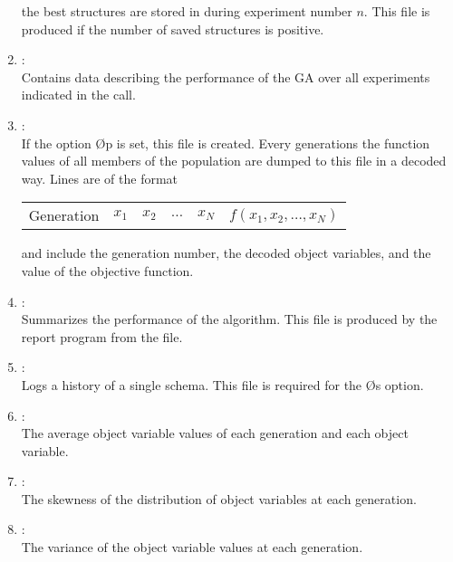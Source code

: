 \begin{enumerate}
	the best structures are stored in  during experiment 
	number $n$.  
	This file  is produced if the number of saved structures is positive.
%
\item	{}: 						\\
	Contains data describing the performance of  the  GA over all
	experiments indicated in the call.
%
\item	{}: 						\\
	If the option \O{p} is set, this file is created. 
	Every  generations the function values of 
	all members of the population are dumped to this file in a decoded way. 
	Lines are of the format
	\begin{center}
	\begin{tabular}{rrrcrr}
		Generation	& $x_1$ & $x_2$ & $\ldots$ 
				& $x_N$ & $f(x_1,x_2,\ldots,x_N)$ \\
	\end{tabular}
	\end{center}
	and include the generation number, the decoded object variables, 
	and the value of the objective function.
%
\item	{}: 						\\
	Summarizes  the  performance  of  the  algorithm.
       	This  file  is produced by the report program from the 
	 file. 
%
\item	{}: 						\\
	Logs a history of a single schema.  
	This file  is required for the \O{s} option.
%
\item	{}:						\\
	The average object variable values of each generation and 
	each object variable.
%
\item	{}:						\\
	The skewness of the distribution of object variables at each
	generation.
%
\item	{}:						\\
	The variance of the object variable values at each generation.
%

\end{enumerate}

